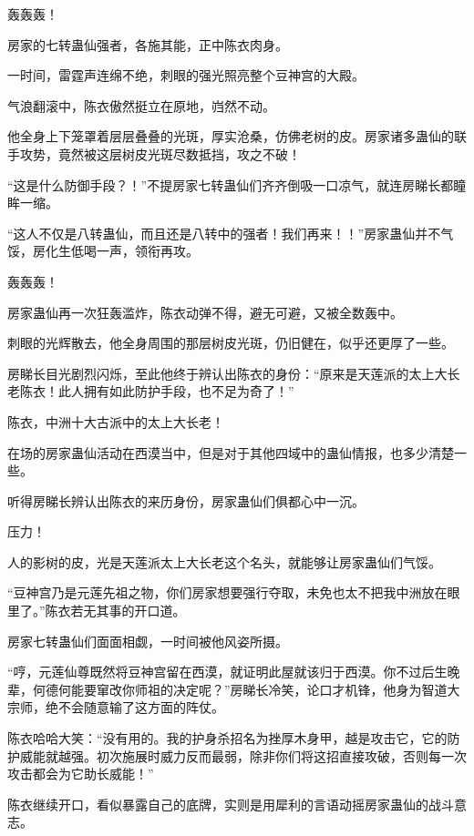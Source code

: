 
\begin{this_body}



轰轰轰！

房家的七转蛊仙强者，各施其能，正中陈衣肉身。

一时间，雷霆声连绵不绝，刺眼的强光照亮整个豆神宫的大殿。

气浪翻滚中，陈衣傲然挺立在原地，岿然不动。

他全身上下笼罩着层层叠叠的光斑，厚实沧桑，仿佛老树的皮。房家诸多蛊仙的联手攻势，竟然被这层树皮光斑尽数抵挡，攻之不破！

“这是什么防御手段？！”不提房家七转蛊仙们齐齐倒吸一口凉气，就连房睇长都瞳眸一缩。

“这人不仅是八转蛊仙，而且还是八转中的强者！我们再来！！”房家蛊仙并不气馁，房化生低喝一声，领衔再攻。

轰轰轰！

房家蛊仙再一次狂轰滥炸，陈衣动弹不得，避无可避，又被全数轰中。

刺眼的光辉散去，他全身周围的那层树皮光斑，仍旧健在，似乎还更厚了一些。

房睇长目光剧烈闪烁，至此他终于辨认出陈衣的身份：“原来是天莲派的太上大长老陈衣！此人拥有如此防护手段，也不足为奇了！”

陈衣，中洲十大古派中的太上大长老！

在场的房家蛊仙活动在西漠当中，但是对于其他四域中的蛊仙情报，也多少清楚一些。

听得房睇长辨认出陈衣的来历身份，房家蛊仙们俱都心中一沉。

压力！

人的影树的皮，光是天莲派太上大长老这个名头，就能够让房家蛊仙们气馁。

“豆神宫乃是元莲先祖之物，你们房家想要强行夺取，未免也太不把我中洲放在眼里了。”陈衣若无其事的开口道。

房家七转蛊仙们面面相觑，一时间被他风姿所摄。

“哼，元莲仙尊既然将豆神宫留在西漠，就证明此屋就该归于西漠。你不过后生晚辈，何德何能要窜改你师祖的决定呢？”房睇长冷笑，论口才机锋，他身为智道大宗师，绝不会随意输了这方面的阵仗。

陈衣哈哈大笑：“没有用的。我的护身杀招名为挫厚木身甲，越是攻击它，它的防护威能就越强。初次施展时威力反而最弱，除非你们将这招直接攻破，否则每一次攻击都会为它助长威能！”

陈衣继续开口，看似暴露自己的底牌，实则是用犀利的言语动摇房家蛊仙的战斗意志。


\end{this_body}
